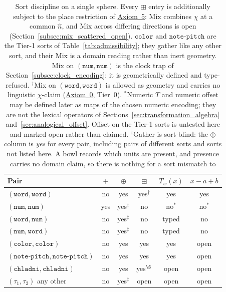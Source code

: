 \documentclass[12pt, a4paper]{article}
\begin{document}
\begin{table}[h]
\centering
\begin{tabular}{lccccc}
\hline
Pair & $+$ & $\oplus$ & $\boxplus$ & $T_w(x)$ & $x-a+b$ \\
\hline
$(\mathtt{word},\mathtt{word})$ & no & yes & yes$^{\dagger}$ & yes & yes \\
$(\mathtt{num},\mathtt{num})$   & yes & yes$^{\ddagger}$ & no  & no$^{*}$ & no$^{*}$ \\
$(\mathtt{word},\mathtt{num})$  & no & yes$^{\ddagger}$ & no  & typed & no \\
$(\mathtt{num},\mathtt{word})$  & no & yes$^{\ddagger}$ & no  & typed & no \\
$(\mathtt{color},\mathtt{color})$ & no & yes & yes & yes & open \\
$(\mathtt{note\text{-}pitch},\mathtt{note\text{-}pitch})$ & no & yes & yes & yes & open \\
$(\mathtt{chladni},\mathtt{chladni})$ & no & yes & yes$^{\S}$ & open & open \\
$(\tau_1,\tau_2)$ any other & no & yes$^{\ddagger}$ & open & open & open \\
\hline
\end{tabular}
\caption{Sort discipline on a single sphere. Every $\boxplus$ entry is
additionally subject to the place restriction of
\hyperref[subsec:axiom_interference]{Axiom~5}: Mix combines $\chi$ at a common
$\hat n$, and Mix across differing directions is open
(Section~\ref{subsec:mix_scattered_open}).
$\mathtt{color}$ and $\mathtt{note\text{-}pitch}$ are the Tier-1 sorts of
Table~\ref{tab:admissibility}; they gather like any other sort, and
their Mix is a domain reading rather than inert geometry.
Mix on $(\mathtt{num},\mathtt{num})$ is the clock trap of
Section~\ref{subsec:clock_encoding}: it is geometrically defined and
type-refused. $^{\dagger}$Mix on $(\mathtt{word},\mathtt{word})$ is
allowed as geometry and carries no linguistic $\chi$-claim
(\hyperref[subsec:axiom0_admissibility]{Axiom~0}, Tier~0).
$^{*}$Numeric $T$ and numeric offset may be defined later as
maps of the chosen numeric encoding; they are not the lexical
operators of Sections~\ref{sec:transformation_algebra}
and~\ref{sec:analogical_offset}. Offset on the Tier-1 sorts is
untested here and marked open rather than claimed.
$^{\ddagger}$Gather is sort-blind: the $\oplus$ column is \emph{yes}
for every pair, including pairs of different sorts and sorts not
listed here. A bowl records which units are present, and presence
carries no domain claim, so there is nothing for a sort mismatch to
}
\end{table}
\end{document}
